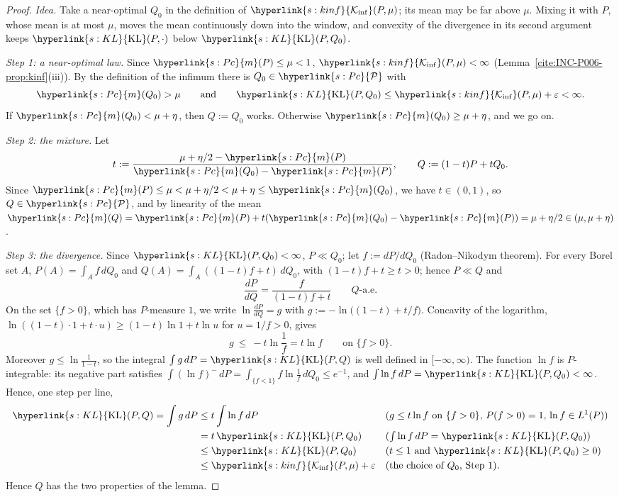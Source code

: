 \documentclass[11pt]{article}
\newcommand{\sy}[2]{\hyperlink{#1}{#2}}
\newcommand{\Pc}{\sy{s:Pc}{\mathcal{P}}}
\newcommand{\m}{\sy{s:Pc}{m}}
\newcommand{\KL}{\sy{s:KL}{\mathrm{KL}}}
\newcommand{\Kinf}{\sy{s:kinf}{\mathcal{K}_{\inf}}}
\begin{document}
\begin{proof}
\emph{Idea.} Take a near-optimal $Q_0$ in the definition of $\Kinf(P,\mu)$; its mean may be far
above $\mu$. Mixing it with $P$, whose mean is at most $\mu$, moves the mean continuously down into
the window, and convexity of the divergence in its second argument keeps $\KL(P,\cdot)$ below
$\KL(P,Q_0)$.

\emph{Step 1: a near-optimal law.} Since $\m(P)\le\mu<1$, $\Kinf(P,\mu)<\infty$
(Lemma~\ref{cite:INC-P006-prop:kinf}(iii)). By the definition of the infimum there is $Q_0\in\Pc$
with
\begin{equation*}
\m(Q_0)>\mu\qquad\text{and}\qquad\KL(P,Q_0)\le\Kinf(P,\mu)+\varepsilon<\infty .
\end{equation*}
If $\m(Q_0)<\mu+\eta$, then $Q:=Q_0$ works. Otherwise $\m(Q_0)\ge\mu+\eta$, and we go on.

\emph{Step 2: the mixture.} Let
\begin{equation*}
t:=\frac{\mu+\eta/2-\m(P)}{\m(Q_0)-\m(P)},\qquad Q:=(1-t)P+tQ_0 .
\end{equation*}
Since $\m(P)\le\mu<\mu+\eta/2<\mu+\eta\le\m(Q_0)$, we have $t\in(0,1)$, so $Q\in\Pc$, and by
linearity of the mean $\m(Q)=\m(P)+t(\m(Q_0)-\m(P))=\mu+\eta/2\in(\mu,\mu+\eta)$.

\emph{Step 3: the divergence.} Since $\KL(P,Q_0)<\infty$, $P\ll Q_0$; let $f:=dP/dQ_0$ (Radon--Nikodym
theorem). For every Borel set $A$, $P(A)=\int_Af\,dQ_0$ and $Q(A)=\int_A((1-t)f+t)\,dQ_0$, with
$(1-t)f+t\ge t>0$; hence $P\ll Q$ and
\begin{equation*}
\frac{dP}{dQ}=\frac{f}{(1-t)f+t}\qquad Q\text{-a.e.}
\end{equation*}
On the set $\{f>0\}$, which has $P$-measure $1$, we write $\ln\frac{dP}{dQ}=g$ with
$g:=-\ln\big((1-t)+t/f\big)$. Concavity of the logarithm, $\ln((1-t)\cdot1+t\cdot u)\ge(1-t)\ln1+t\ln u$
for $u=1/f>0$, gives
\begin{equation*}
g\ \le\ -t\ln\frac1f=t\ln f\qquad\text{on }\{f>0\}.
\end{equation*}
Moreover $g\le\ln\frac1{1-t}$, so the integral $\int g\,dP=\KL(P,Q)$ is well defined in
$[-\infty,\infty)$. The function $\ln f$ is $P$-integrable: its negative part satisfies
$\int(\ln f)^-\,dP=\int_{\{f<1\}}f\ln\frac1f\,dQ_0\le e^{-1}$, and $\int\ln f\,dP=\KL(P,Q_0)<\infty$.
Hence, one step per line,
\begin{align*}
\KL(P,Q)=\int g\,dP&\le t\int\ln f\,dP
&&\text{($g\le t\ln f$ on $\{f>0\}$, $P(f>0)=1$, $\ln f\in L^1(P)$)}\\
&=t\,\KL(P,Q_0)
&&\text{($\textstyle\int\ln f\,dP=\KL(P,Q_0)$)}\\
&\le\KL(P,Q_0)
&&\text{($t\le1$ and $\KL(P,Q_0)\ge0$)}\\
&\le\Kinf(P,\mu)+\varepsilon
&&\text{(the choice of $Q_0$, Step 1)}.
\end{align*}
Hence $Q$ has the two properties of the lemma.
\end{proof}
\end{document}
